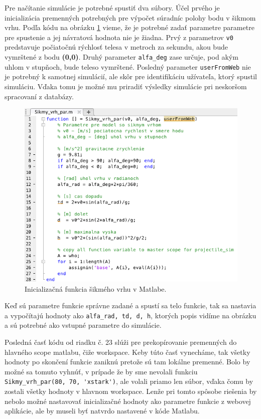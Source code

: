 Pre načítanie simulácie je potrebné spustiť dva súbory. Účel prvého je inicializácia premenných potrebných pre výpočet súradníc polohy bodu v šikmom vrhu. Podľa kódu na obrázku \ref{img-matlab-function} vieme, že je potrebné zadať parametre parametre pre spustenie a jej návratová hodnota nie je žiadna. Prvý z parametrov \verb|v0| predstavuje počiatočnú rýchlosť telesa v metroch za sekundu, akou bude vymrštené z bodu \textbf{(0,0)}. Druhý parameter \verb|alfa_deg| zase určuje, pod akým uhlom v stupňoch, bude teleso vymrštené. Posledný parameter \verb|userFromWeb| nie je potrebný k samotnej simulácií, ale skôr pre identifikáciu užívateľa, ktorý spustil simuláciu. Vďaka tomu je možné mu priradiť výsledky simulácie pri neskoršom spracovaní z databázy.

\begin{figure}[H]
  \centering
  \includegraphics[scale=0.7]{img/code/matlab-function.png}
  \caption{Inicializačná funkcia šikmého vrhu v Matlabe.}
  \label{img-matlab-function}
\end{figure}

Keď sú parametre funkcie správne zadané a spustí sa telo funkcie, tak sa nastavia a vypočítajú hodnoty ako \verb|alfa_rad, td, d, h|, ktorých popis vidíme na obrázku a sú potrebné ako vstupné parametre do simulácie.

Posledná časť kódu od riadku č. 23 slúži pre prekopírovanie premenných do hlavného scope matlabu, čiže workspace. Keby túto časť vynecháme, tak všetky hodnoty po skončení funkcie zaniknú pretože sú tam lokálne premenné. Bolo by možné sa tomuto vyhnúť, v prípade že by sme nevolali funkciu \verb|Sikmy_vrh_par(80, 70, 'xstark')|, ale volali priamo len súbor, vďaka čomu by zostali všetky hodnoty v hlavnom workspace. Lenže pri tomto spôsobe riešenia by nebolo možné nastavovať inicializačné hodnoty ako parametre funkcie z webovej aplikácie, ale by museli byť natvrdo nastavené v kóde Matlabu.

